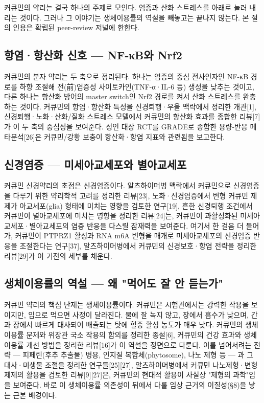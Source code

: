 \documentclass[12pt,oneside]{book}
\begin{document}
커큐민의 약리는 결국 하나의 주제로 모인다. 염증과 산화 스트레스를 아래로 눌러 내리는 것이다. 그러나 그 이야기는 생체이용률의 역설을 빼놓고는 끝나지 않는다. 본 절의 인용은 확립된 peer-review 저널에 한한다.

\subsection{항염·항산화 신호 — NF-κB와 Nrf2}

커큐민의 분자 약리는 두 축으로 정리된다. 하나는 염증의 중심 전사인자인 NF-κB 경로를 하향 조절해 전(前)염증성 사이토카인(TNF-α·IL-6 등) 생성을 낮추는 것이고, 다른 하나는 항산화 방어의 master switch인 Nrf2 경로를 켜서 산화 스트레스를 완충하는 것이다. 커큐민의 항염·항산화 특성을 신경퇴행·우울 맥락에서 정리한 개관[1], 신경퇴행·노화·산화/질화 스트레스 모델에서 커큐민의 항산화 효과를 종합한 리뷰[7]가 이 두 축의 중심성을 보여준다. 성인 대상 RCT를 GRADE로 종합한 용량-반응 메타분석[26]은 커큐민/강황 보충이 항산화·항염 지표와 관련됨을 보고한다.

\subsection{신경염증 — 미세아교세포와 별아교세포}

커큐민 신경약리의 초점은 신경염증이다. 알츠하이머병 맥락에서 커큐민으로 신경염증을 다루기 위한 약리학적 고려를 정리한 리뷰[23], 노화·신경염증에서 변형 커큐민 제제가 아교세포(glia) 형태에 미치는 영향을 검토한 연구[19], 흔한 신경퇴행 조건에서 커큐민이 별아교세포에 미치는 영향을 정리한 리뷰[24]는, 커큐민이 과활성화된 미세아교세포·별아교세포의 염증 반응을 다스릴 잠재력을 보여준다. 여기서 한 걸음 더 들어가, 커큐민이 PTPRZ1 활성과 RNA m6A 변형을 매개로 미세아교세포의 신경염증 반응을 조절한다는 연구[37], 알츠하이머병에서 커큐민의 신경보호·항염 전략을 정리한 리뷰[29]가 이 기전의 세부를 채운다.

\subsection{생체이용률의 역설 — 왜 "먹어도 잘 안 듣는가"}

커큐민 약리의 핵심 난제는 생체이용률이다. 커큐민은 시험관에서는 강력한 작용을 보이지만, 입으로 먹으면 사정이 달라진다. 물에 잘 녹지 않고, 장에서 흡수가 낮으며, 간과 장에서 빠르게 대사되어 배출되는 탓에 혈중 활성 농도가 매우 낮다. 커큐민의 생체이용률 문제와 위장관 국소 작용의 함의를 정리한 종설[6], 커큐민의 건강 효과와 생체이용률 개선 방법을 정리한 리뷰[16]가 이 역설을 정면으로 다룬다. 이를 넘어서려는 전략 — 피페린(후추 추출물) 병용, 인지질 복합체(phytosome), 나노 제형 등 — 과 그 대사·미생물 조절을 정리한 연구들[25][27], 알츠하이머병에서 커큐민 나노제형·변형 제제의 활용을 검토한 리뷰[9][27]은, 커큐민의 현대적 활용이 사실상 "제형의 과학"임을 보여준다. 바로 이 생체이용률 의존성이 뒤에서 다룰 임상 근거의 이질성(§8)을 낳는 근본 배경이다.
\end{document}
